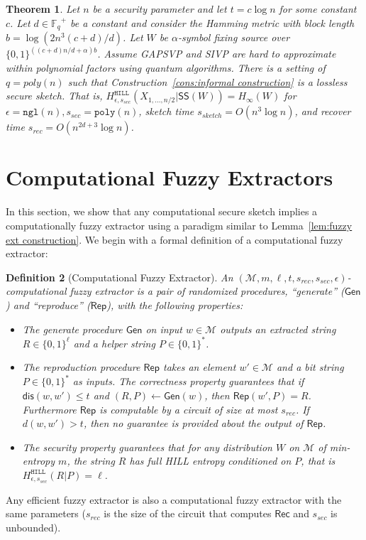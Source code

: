 \documentclass[11pt]{article}
\newcommand{\lemref}[1]{\mbox{Lemma~\ref{#1}}}
\newcommand{\consref}[1]{\mbox{Construction~\ref{#1}}}
\newcommand{\class}[1]{{\ensuremath{\mathsf{#1}}}}
\newcommand{\gen}{\ensuremath{\class{Gen}}\xspace}
\newcommand{\rep}{\ensuremath{\class{Rep}}\xspace}
\newcommand{\sketch}{\ensuremath{\class{SS}}\xspace}
\newcommand{\rec}{\ensuremath{\class{Rec}}\xspace}
\newcommand{\zo}{\ensuremath{\{0, 1\}}}
\newcommand{\Fq}{\ensuremath{\mathbb{F}_q}}
\newcommand{\dis}{\ensuremath{\mathsf{dis}}}
\newcommand{\hill}{\ensuremath{\mathtt{HILL}}\xspace}
\newcommand{\poly}{\ensuremath{\mathtt{poly}}\xspace}
\newcommand{\ngl}{\ensuremath{\mathtt{ngl}}\xspace}
\newcommand{\Hoo}{\mathrm{H}_\infty}
\newtheorem{theorem}{Theorem}[section]
\newtheorem{definition}[theorem]{Definition}
\begin{document}
\begin{theorem}
\label{thm:lossless block sketch log}
Let $n$ be a security parameter and let $t = c\log n$ for some constant $c$.  Let $d\in\Fq^+$ be a constant and consider the Hamming metric with block length $b = \log (2n^3 (c+d)/d)$.  Let $W$ be $\alpha$-symbol fixing source over $\zo^{((c+d)n/d+\alpha)b}$.  Assume GAPSVP and SIVP are hard to approximate within polynomial factors using quantum algorithms.   There is a setting of $q = poly(n)$ such that \consref{cons:informal construction} is a lossless secure sketch.  That is, $H^{\hill}_{\epsilon, s_{sec}}(X_{1,..., n/2} |\sketch(W)) = H_\infty(W)$ for %
$\epsilon = \ngl(n), s_{sec} = \poly(n)$, sketch time $s_{sketch} = O(n^3\log n)$, and recover time $s_{rec}= O(n^{2d+3} \log n)$.
\end{theorem}



\section{Computational Fuzzy Extractors}
In this section, we show that any computational secure sketch implies a computationally fuzzy extractor using a paradigm similar to \lemref{lem:fuzzy ext construction}.  We begin with a formal definition of a computational fuzzy extractor:
\label{sec:comp fuzzy extractors}
\begin{definition}[Computational Fuzzy Extractor]\label{def:comp fuzzy extractor}
An $(\mathcal{M}, m, \ell, t, s_{rec}, s_{sec}, \epsilon)$-\emph{computational fuzzy extractor} is a pair of randomized procedures, ``generate'' (\gen) and ``reproduce'' (\rep), with the following properties:
\begin{itemize}
\item The generate procedure \gen on input $w\in \mathcal{M}$ outputs an extracted string $R\in\{0,1\}^\ell$ and a helper string $P\in\{0,1\}^*$.
\item The reproduction procedure \rep takes an element $w'\in\mathcal{M}$ and a bit string $P\in\{0,1\}^*$ as inputs.  The \emph{correctness} property guarantees that if $\dis(w, w')\leq t$ and $(R, P)\leftarrow \gen(w)$, then $\rep( w', P) = R$.  Furthermore \rep is computable by a circuit of size at most $s_{rec}$.  If $d(w, w') > t$, then no guarantee is provided about the output of \rep.
\item The \emph{security} property guarantees that for any distribution $W$ on $\mathcal{M}$ of min-entropy $m$, the string $R$ has full HILL entropy conditioned on $P$, that is $H^\hill_{\epsilon, s_{sec}}(R | P) = \ell$.
\end{itemize}
\end{definition}
Any efficient fuzzy extractor is also a computational fuzzy extractor with the same parameters ($s_{rec}$ is the size of the circuit that computes \rec and $s_{sec}$ is unbounded).  
\end{document}
